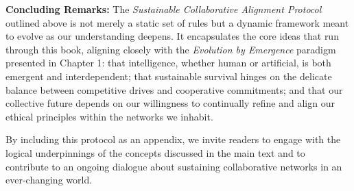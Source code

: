 \bigskip
\textbf{Concluding Remarks:}   
The \emph{Sustainable Collaborative Alignment Protocol} outlined above is not merely a static set of rules but a dynamic framework meant to evolve as our understanding deepens. It encapsulates the core ideas that run through this book, aligning closely with the \emph{Evolution by Emergence} paradigm presented in Chapter 1: that intelligence, whether human or artificial, is both emergent and interdependent; that sustainable survival hinges on the delicate balance between competitive drives and cooperative commitments; and that our collective future depends on our willingness to continually refine and align our ethical principles within the networks we inhabit. %

By including this protocol as an appendix, we invite readers to engage with the logical underpinnings of the concepts discussed in the main text and to contribute to an ongoing dialogue about sustaining collaborative networks in an ever-changing world.
\cleardoublepage
